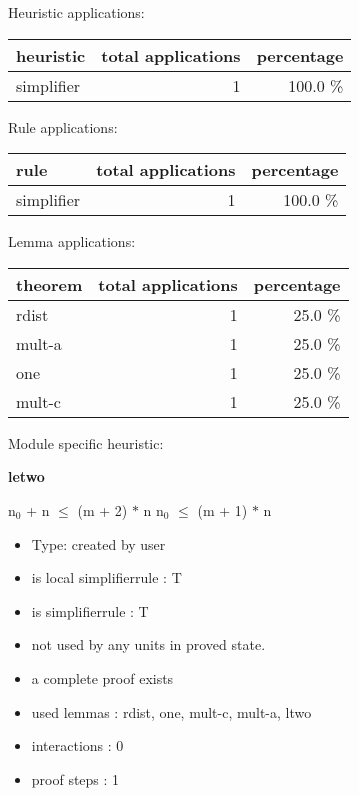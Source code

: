 \documentclass[a4paper]{article}
\begin{document}
\medskip


Heuristic applications:

\begin{supertabular}{l|r|r}
heuristic	& total applications & percentage \\ \hline
simplifier & 1 & 100.0 \% \\

\end{supertabular}

Rule applications:

\begin{supertabular}{l|r|r}
rule	        & total applications & percentage \\ \hline
simplifier & 1 & 100.0 \% \\

\end{supertabular}

Lemma applications:

\begin{supertabular}{l|r|r}
theorem	        & total applications & percentage \\ \hline
rdist & 1 & 25.0 \% \\
mult-a & 1 & 25.0 \% \\
one & 1 & 25.0 \% \\
mult-c & 1 & 25.0 \% \\

\end{supertabular}

Module specific heuristic:

\pagebreak

{\LARGE\bf letwo}\label{lemma-letwo}

\medskip

 \Fol $\mbox{n}_{0}$ + n $\le$ (m + 2) $*$ n \Equiv $\mbox{n}_{0}$ $\le$ (m + 1) $*$ n

\begin{itemize}

\item Type: created by user

\item is local simplifierrule : T
\item is simplifierrule : T
\item not used by any units in proved state.
\item       a complete proof exists
\item       used lemmas  : rdist, one, mult-c, mult-a, ltwo
\item       interactions : 0
\item       proof steps  : 1
\end{itemize}
\end{document}
